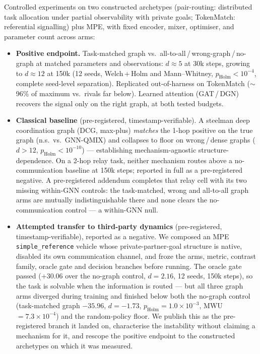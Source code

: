 \documentclass[10pt,a4paper]{article}
\begin{document}
Controlled experiments on two constructed archetypes (pair-routing: distributed
task allocation under partial observability with private goals; TokenMatch:
referential signalling) plus MPE, with fixed encoder, mixer, optimiser, and
parameter count across arms:

\begin{itemize}
\item \textbf{Positive endpoint.} Task-matched graph vs.\ all-to-all\,/\,wrong-graph\,/\,no-graph
at matched parameters and observations: $d \approx 5$ at 30k steps, growing to
$d \approx 12$ at 150k (12 seeds, Welch\,+\,Holm and Mann--Whitney,
$p_{\mathrm{Holm}} < 10^{-4}$, complete seed-level separation). Replicated
out-of-harness on TokenMatch ($\sim$96\% of maximum vs.\ rivals far below).
Learned attention (GAT\,/\,DGN) recovers the signal only on the right graph, at
both tested budgets.

\item \textbf{Classical baseline} (pre-registered, timestamp-verifiable). A
steelman deep coordination graph (DCG, max-plus) \emph{matches} the 1-hop
positive on the true graph (n.s.\ vs.\ GNN-QMIX) and collapses to floor on
wrong\,/\,dense graphs ($d > 12$, $p_{\mathrm{Holm}} < 10^{-10}$) ---
establishing mechanism-agnostic structure-dependence. On a 2-hop relay task,
neither mechanism routes above a no-communication baseline at 150k steps;
reported in full as a pre-registered negative. A pre-registered addendum
completes that relay cell with its two missing within-GNN controls: the
task-matched, wrong and all-to-all graph arms are mutually indistinguishable
there and none clears the no-communication control --- a within-GNN null.

\item \textbf{Attempted transfer to third-party dynamics} (pre-registered,
timestamp-verifiable), reported as a negative. We composed an MPE
\texttt{simple\_reference} vehicle whose private-partner-goal structure is
native, disabled its own communication channel, and froze the arms, metric,
contrast family, oracle gate and decision branches before running. The oracle
gate passed ($+30.06$ over the no-graph control, $d = 2.16$, 12 seeds, 150k
steps), so the task is solvable when the information is routed --- but all three
graph arms diverged during training and finished below both the no-graph control
(task-matched graph $-35.96$, $d = -1.73$, $p_{\mathrm{Holm}} = 1.0\times10^{-3}$,
MWU $= 7.3\times10^{-4}$) and the random-policy floor. We publish this as the
pre-registered branch it landed on, characterise the instability without claiming
a mechanism for it, and rescope the positive endpoint to the constructed
archetypes on which it was measured.


\end{itemize}
\end{document}
